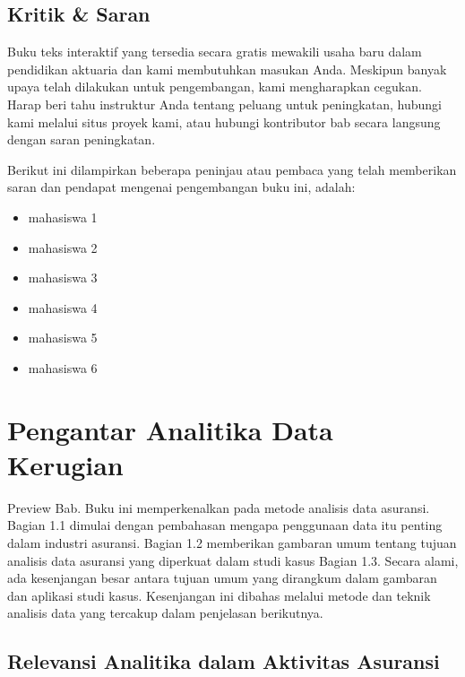 \documentclass[
]{book}
\providecommand{\tightlist}{%
  \setlength{\itemsep}{0pt}\setlength{\parskip}{0pt}}
\begin{document}
\hypertarget{kritik-saran}{%
\section*{Kritik \& Saran}\label{kritik-saran}}

Buku teks interaktif yang tersedia secara gratis mewakili usaha baru dalam pendidikan aktuaria dan kami membutuhkan masukan Anda. Meskipun banyak upaya telah dilakukan untuk pengembangan, kami mengharapkan cegukan. Harap beri tahu instruktur Anda tentang peluang untuk peningkatan, hubungi kami melalui situs proyek kami, atau hubungi kontributor bab secara langsung dengan saran peningkatan.

Berikut ini dilampirkan beberapa peninjau atau pembaca yang telah memberikan saran dan pendapat mengenai pengembangan buku ini, adalah:

\begin{itemize}
\tightlist
\item
  mahasiswa 1
\item
  mahasiswa 2
\item
  mahasiswa 3
\item
  mahasiswa 4
\item
  mahasiswa 5
\item
  mahasiswa 6
\end{itemize}

\hypertarget{pengantar-analitika-data-kerugian}{%
\chapter{Pengantar Analitika Data Kerugian}\label{pengantar-analitika-data-kerugian}}

Preview Bab. Buku ini memperkenalkan pada metode analisis data asuransi. Bagian 1.1 dimulai dengan pembahasan mengapa penggunaan data itu penting dalam industri asuransi. Bagian 1.2 memberikan gambaran umum tentang tujuan analisis data asuransi yang diperkuat dalam studi kasus Bagian 1.3. Secara alami, ada kesenjangan besar antara tujuan umum yang dirangkum dalam gambaran dan aplikasi studi kasus. Kesenjangan ini dibahas melalui metode dan teknik analisis data yang tercakup dalam penjelasan berikutnya.

\hypertarget{relevansi-analitika-dalam-aktivitas-asuransi}{%
\section{Relevansi Analitika dalam Aktivitas Asuransi}\label{relevansi-analitika-dalam-aktivitas-asuransi}}
\end{document}
